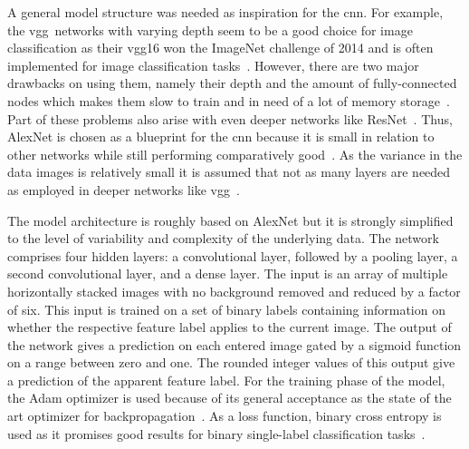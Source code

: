 A general model structure was needed as inspiration for the \acrshort{cnn}. For example, the \acrfull{vgg}~networks with varying depth seem to be a good choice for image classification as their \acrshort{vgg}16 won the ImageNet challenge of 2014 and is often implemented for image classification tasks~\citep{hassan2018vgg,vgg2014original}. However, there are two major drawbacks on using them, namely their depth and the amount of fully-connected nodes which makes them slow to train and in need of a lot of memory storage~\citep{hassan2018vgg,zhang2015accelerating}. Part of these problems also arise with even deeper networks like ResNet~\citep{resnet2016original,hassan2019resnet}. Thus, AlexNet is chosen as a blueprint for the \acrshort{cnn} because it is small in relation to other networks while still performing comparatively good~\citep{hassan2019alexnet,alexnet2012original,geron2019hands}. As the variance in the data images is relatively small it is assumed that not as many layers are needed as employed in deeper networks like \acrshort{vgg}~\citep{geron2019hands}.
 
\bigskip
The model architecture is roughly based on AlexNet but it is strongly simplified to the level of variability and complexity of the underlying data. The network comprises four hidden layers: a convolutional layer, followed by a pooling layer, a second convolutional layer, and a dense layer. The input is an array of multiple horizontally stacked images with no background removed and reduced by a factor of six. This input is trained on a set of binary labels containing information on whether the respective feature label applies to the current image. The output of the network gives a prediction on each entered image gated by a sigmoid function on a range between zero and one. The rounded integer values of this output give a prediction of the apparent feature label.
For the training phase of the model, the Adam optimizer is used because of its general acceptance as the state of the art optimizer for backpropagation~\citep{bushaev2018adam,kingma2014adam}. As a loss function, binary cross entropy is used as it promises good results for binary single-label classification tasks~\citep{geron2019hands,godoy2018understanding,dertat2017applied}.
 
